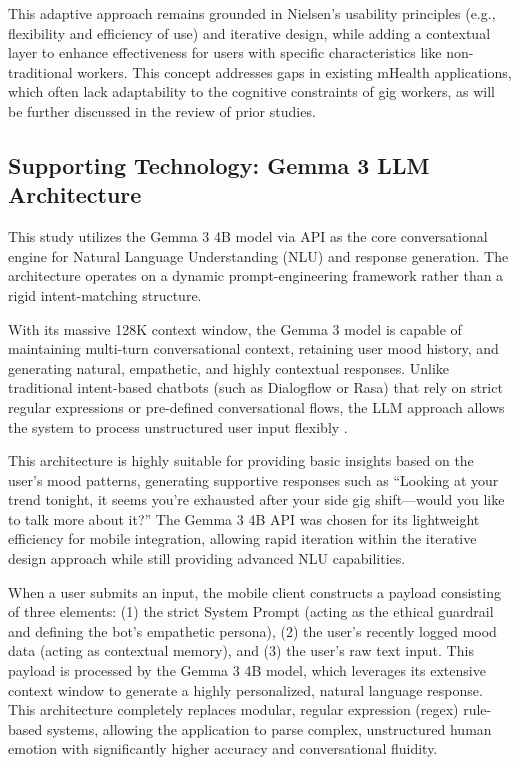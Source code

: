 This adaptive approach remains grounded in Nielsen's usability principles (e.g., flexibility and efficiency of use) and iterative design, while adding a contextual layer to enhance effectiveness for users with specific characteristics like non-traditional workers. This concept addresses gaps in existing mHealth applications, which often lack adaptability to the cognitive constraints of gig workers, as will be further discussed in the review of prior studies.

\subsection{Supporting Technology: Gemma 3 LLM Architecture}

This study utilizes the Gemma 3 4B model via API as the core conversational engine for Natural Language Understanding (NLU) and response generation. The architecture operates on a dynamic prompt-engineering framework rather than a rigid intent-matching structure.

With its massive 128K context window, the Gemma 3 model is capable of maintaining multi-turn conversational context, retaining user mood history, and generating natural, empathetic, and highly contextual responses. Unlike traditional intent-based chatbots (such as Dialogflow or Rasa) that rely on strict regular expressions or pre-defined conversational flows, the LLM approach allows the system to process unstructured user input flexibly \cite{oulasvirta2024personalization}.

This architecture is highly suitable for providing basic insights based on the user's mood patterns, generating supportive responses such as ``Looking at your trend tonight, it seems you're exhausted after your side gig shift---would you like to talk more about it?'' The Gemma 3 4B API was chosen for its lightweight efficiency for mobile integration, allowing rapid iteration within the iterative design approach while still providing advanced NLU capabilities.

When a user submits an input, the mobile client constructs a payload consisting of three elements: (1) the strict System Prompt (acting as the ethical guardrail and defining the bot's empathetic persona), (2) the user's recently logged mood data (acting as contextual memory), and (3) the user's raw text input. This payload is processed by the Gemma 3 4B model, which leverages its extensive context window to generate a highly personalized, natural language response. This architecture completely replaces modular, regular expression (regex) rule-based systems, allowing the application to parse complex, unstructured human emotion with significantly higher accuracy and conversational fluidity.

